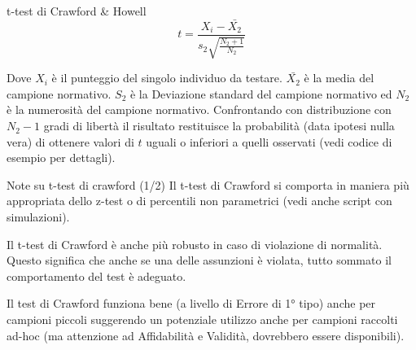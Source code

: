 \documentclass[
  ignorenonframetext,
  aspectratio=169,
]{beamer}
\begin{document}

\begin{frame}{t-test di Crawford \& Howell}
\label{t-test-di-crawford-howell}
\[
t = \frac{X_i - \bar{X_2}}{s_2\sqrt{\frac{N_2+1}{N_2}}}
\]

\vspace{1em}

Dove \(X_i\) è il punteggio del singolo individuo da testare.
\(\bar{X_2}\) è la media del campione normativo. \(S_2\) è la Deviazione
standard del campione normativo ed \(N_2\) è la numerosità del campione
normativo. Confrontando con distribuzione con \(N_2-1\) gradi di libertà
il risultato restituisce la probabilità (data ipotesi nulla vera) di
ottenere valori di \(t\) uguali o inferiori a quelli osservati (vedi
codice di esempio per dettagli).
\end{frame}

\begin{frame}{Note su t-test di crawford (1/2)}
\label{note-su-t-test-di-crawford-12}
Il t-test di Crawford si comporta in maniera più appropriata dello
z-test o di percentili non parametrici (vedi anche script con
simulazioni).

Il t-test di Crawford è anche più robusto in caso di violazione di
normalità. Questo significa che anche se una delle assunzioni è violata,
tutto sommato il comportamento del test è adeguato.

Il test di Crawford funziona bene (a livello di Errore di 1° tipo) anche
per campioni piccoli suggerendo un potenziale utilizzo anche per
campioni raccolti ad-hoc (ma attenzione ad Affidabilità e Validità,
dovrebbero essere disponibili).
\end{frame}
\end{document}
